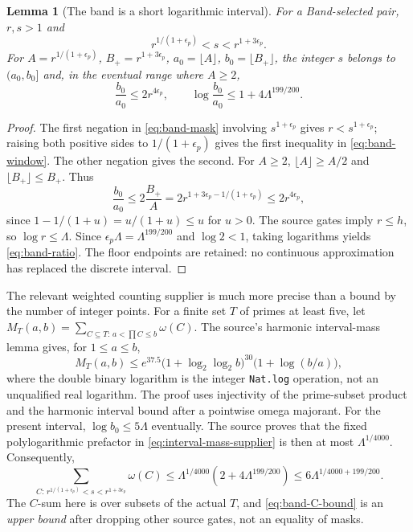 \documentclass[11pt]{article}
\newcommand{\Lam}{\Lambda}
\newcommand{\omegaR}{\omega}
\newcommand{\epsp}{\epsilon_p}
\newtheorem{lemma}[theorem]{Lemma}
\theoremstyle{definition}
\theoremstyle{remark}
\newcommand{\1}{\mathbf 1}
\begin{document}
\begin{lemma}[The band is a short logarithmic interval]
\label{lem:band-interval}
For a Band-selected pair, $r,s>1$ and
\begin{equation}\label{eq:band-window}
 r^{1/(1+\epsp)}<s<r^{1+3\epsp}.
\end{equation}
For $A=r^{1/(1+\epsp)}$, $B_+=r^{1+3\epsp}$,
$a_0=\lfloor A\rfloor$, $b_0=\lfloor B_+\rfloor$,
the integer $s$ belongs to $(a_0,b_0]$ and, in the eventual
range where $A\ge2$,
\begin{equation}\label{eq:band-ratio}
 \frac{b_0}{a_0}\le2r^{4\epsp},\qquad
 \log\frac{b_0}{a_0}\le1+4\Lam^{199/200}.
\end{equation}
\end{lemma}
\begin{proof}
The first negation in \eqref{eq:band-mask} involving $s^{1+\epsp}$
gives $r<s^{1+\epsp}$; raising both positive sides to
$1/(1+\epsp)$ gives the first inequality in
\eqref{eq:band-window}. The other negation gives the second.
For $A\ge2$, $\lfloor A\rfloor\ge A/2$ and
$\lfloor B_+\rfloor\le B_+$. Thus
\[
 \frac{b_0}{a_0}\le 2\frac{B_+}{A}
  =2r^{1+3\epsp-1/(1+\epsp)}\le2r^{4\epsp},
\]
since $1-1/(1+u)=u/(1+u)\le u$ for $u>0$.
The source gates imply $r\le h$, so $\log r\le\Lam$.
Since $\epsp\Lam=\Lam^{199/200}$ and
$\log2<1$, taking logarithms yields
\eqref{eq:band-ratio}. The floor endpoints are retained:
no continuous approximation has replaced the discrete interval.
\end{proof}

The relevant weighted counting supplier is much more precise
than a bound by the number of integer points. For a finite set
$T$ of primes at least five, let
\(M_T(a,b)=\sum_{C\subseteq T:\,a<\prod C\le b}\omegaR(C)\).
The source's harmonic interval-mass lemma gives, for $1\le a\le b$,
\begin{equation}\label{eq:interval-mass-supplier}
 M_T(a,b)\le e^{37.5}
 \bigl(1+\log_2\log_2 b\bigr)^{30}
 \bigl(1+\log(b/a)\bigr),
\end{equation}
where the double binary logarithm is the integer \texttt{Nat.log}
operation, not an unqualified real logarithm. The proof uses
injectivity of the prime-subset product and the harmonic interval
bound after a pointwise omega majorant. For the present interval,
$\log b_0\le5\Lam$ eventually. The source proves that the fixed
polylogarithmic prefactor in \eqref{eq:interval-mass-supplier}
is then at most $\Lam^{1/4000}$. Consequently,
\begin{equation}\label{eq:band-C-bound}
 \sum_{C:\,r^{1/(1+\epsp)}<s<r^{1+3\epsp}}\omegaR(C)
 \le \Lam^{1/4000}(2+4\Lam^{199/200})
 \le 6\Lam^{1/4000+199/200}.
\end{equation}
The $C$-sum here is over subsets of the actual $T$, and
\eqref{eq:band-C-bound} is an \emph{upper bound} after dropping
other source gates, not an equality of masks.
\end{document}
